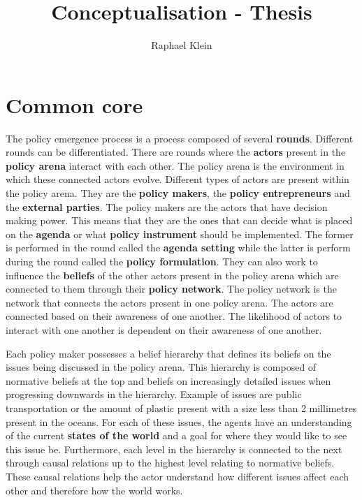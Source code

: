 \documentclass{article}
\title{Conceptualisation - Thesis}
\author{Raphael Klein}
\begin{document}
\maketitle





\section{Common core}

The policy emergence process is a process composed of several {\bfseries rounds}. Different rounds can be differentiated. There are rounds where the {\bfseries actors} present in the {\bfseries policy arena} interact with each other. The policy arena is the environment in which these connected actors evolve. Different types of actors are present within the policy arena. They are the {\bfseries policy makers}, the {\bfseries policy entrepreneurs} and the {\bfseries external parties}. The policy makers are the actors that have decision making power. This means that they are the ones that can decide what is placed on the {\bfseries agenda} or what {\bfseries policy instrument} should be implemented. The former is performed in the round called the {\bfseries agenda setting} while the latter is perform during the round called the {\bfseries policy formulation}. They can also work to influence the {\bfseries beliefs} of the other actors present in the policy arena which are connected to them through their {\bfseries policy network}. The policy network is the network that connects the actors present in one policy arena. The actors are connected based on their awareness of one another. The likelihood of actors to interact with one another is dependent on their awareness of one another.

Each policy maker possesses a belief hierarchy that defines its beliefs on the issues being discussed in the policy arena. This hierarchy is composed of normative beliefs at the top and beliefs on increasingly detailed issues when progressing downwards in the hierarchy. Example of issues are public transportation or the amount of plastic present with a size less than 2 millimetres present in the oceans. For each of these issues, the agents have an understanding of the current {\bfseries states of the world} and a goal for where they would like to see this issue be. Furthermore, each level in the hierarchy is connected to the next through causal relations up to the highest level relating to normative beliefs. These causal relations help the actor understand how different issues affect each other and therefore how the world works.
\end{document}
